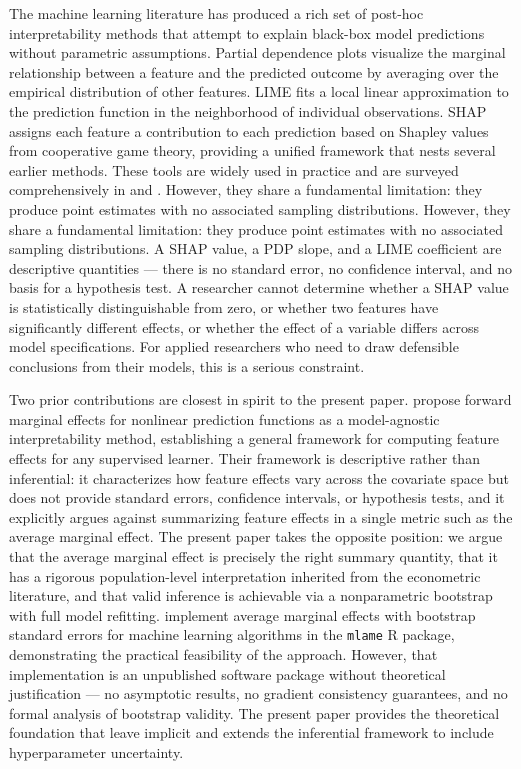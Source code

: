 \documentclass[12pt]{article}
\begin{document}
	The machine learning literature has produced a rich set of post-hoc interpretability methods that attempt to explain black-box model predictions without parametric assumptions. Partial dependence plots \citep{friedman2001pdp} visualize the marginal relationship between a feature and the predicted outcome by averaging over the empirical distribution of other features. LIME \citep{ribeiro2016lime} fits a local linear approximation to the prediction function in the neighborhood of individual observations. SHAP \citep{lundberg2017shap} assigns each feature a contribution to each prediction based on Shapley values from cooperative game theory, providing a unified framework that nests several earlier methods. These tools are widely used in practice and are surveyed comprehensively in \citet{molnar2025} and \citet{doshivelez2017interpretability}. However, they share a fundamental limitation: they produce point estimates with no associated sampling distributions. However, they share a fundamental limitation: they produce point estimates with no associated sampling distributions. A SHAP value, a PDP slope, and a LIME coefficient are descriptive quantities --- there is no standard error, no confidence interval, and no basis for a hypothesis test. A researcher cannot determine whether a SHAP value is statistically distinguishable from zero, or whether two features have significantly different effects, or whether the effect of a variable differs across model specifications. For applied researchers who need to draw defensible conclusions from their models, this is a serious constraint.
	
	Two prior contributions are closest in spirit to the present paper. \citet{scholbeck2024fme} propose forward marginal effects for nonlinear prediction functions as a model-agnostic interpretability method, establishing a general framework for computing feature effects for any supervised learner. Their framework is descriptive rather than inferential: it characterizes how feature effects vary across the covariate space but does not provide standard errors, confidence intervals, or hypothesis tests, and it explicitly argues against summarizing feature effects in a single metric such as the average marginal effect. The present paper takes the opposite position: we argue that the average marginal effect is precisely the right summary quantity, that it has a rigorous population-level interpretation inherited from the econometric literature, and that valid inference is achievable via a nonparametric bootstrap with full model refitting. \citet{beste2019mlame} implement average marginal effects with bootstrap standard errors for machine learning algorithms in the \texttt{mlame} R package, demonstrating the practical feasibility of the approach. However, that implementation is an unpublished software package without theoretical justification --- no asymptotic results, no gradient consistency guarantees, and no formal analysis of bootstrap validity. The present paper provides the theoretical foundation that \citet{beste2019mlame} leave implicit and extends the inferential framework to include hyperparameter uncertainty.
	
\end{document}
